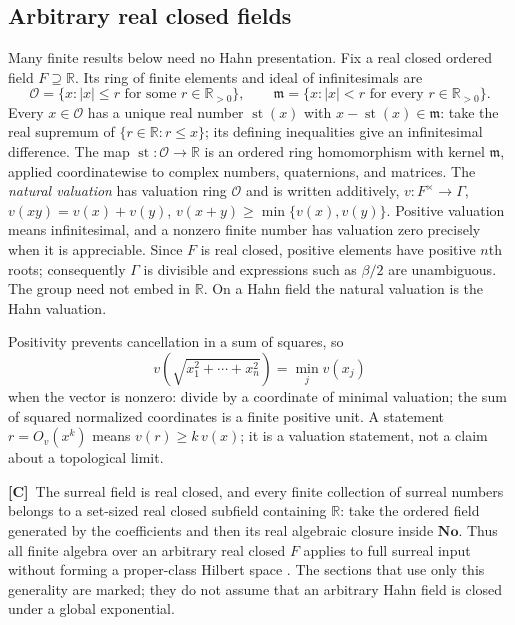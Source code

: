\documentclass[11pt,oneside]{article}
\numberwithin{equation}{section}
\theoremstyle{plain}
\theoremstyle{definition}
\theoremstyle{remark}
\newcommand{\R}{\mathbb R}
\newcommand{\No}{\mathbf{No}}
\newcommand{\OO}{\mathcal O}
\newcommand{\mm}{\mathfrak m}
\DeclareMathOperator{\st}{st}
\newcommand{\abs}[1]{\left|#1\right|}
\newcommand{\TC}{\textcolor{TierC}{\textsf{\bfseries[C]}}}
\begin{document}
\subsection{Arbitrary real closed fields}\label{qgs:hol:sec:scalars}
Many finite results below need no Hahn presentation. Fix a real closed ordered field $F\supseteq\R$. Its ring of finite elements and ideal of infinitesimals are
\[
 \OO=\{x:\abs{x}\leq r\text{ for some }r\in\R_{>0}\},\qquad
 \mm=\{x:\abs{x}<r\text{ for every }r\in\R_{>0}\}.
\]
Every $x\in\OO$ has a unique real number $\st(x)$ with $x-\st(x)\in\mm$: take the real supremum of $\{r\in\R:r\leq x\}$; its defining inequalities give an infinitesimal difference. The map $\st:\OO\to\R$ is an ordered ring homomorphism with kernel $\mm$, applied coordinatewise to complex numbers, quaternions, and matrices. The \emph{natural valuation} has valuation ring $\OO$ and is written additively, $v:F^\times\to\Gamma$, $v(xy)=v(x)+v(y)$, $v(x+y)\ge\min\{v(x),v(y)\}$. Positive valuation means infinitesimal, and a nonzero finite number has valuation zero precisely when it is appreciable. Since $F$ is real closed, positive elements have positive $n$th roots; consequently $\Gamma$ is divisible and expressions such as $\beta/2$ are unambiguous. The group need not embed in $\R$. On a Hahn field the natural valuation is the Hahn valuation.

Positivity prevents cancellation in a sum of squares, so
\begin{equation}\label{qgs:hol:eq:normval}
 v\!\left(\sqrt{x_1^2+\cdots+x_n^2}\right)=\min_jv(x_j)
\end{equation}
when the vector is nonzero: divide by a coordinate of minimal valuation; the sum of squared normalized coordinates is a finite positive unit. A statement $r=O_v(x^k)$ means $v(r)\ge k\,v(x)$; it is a valuation statement, not a claim about a topological limit.

\TC\ The surreal field is real closed, and every finite collection of surreal numbers belongs to a set-sized real closed subfield containing $\R$: take the ordered field generated by the coefficients and then its real algebraic closure inside $\No$. Thus all finite algebra over an arbitrary real closed $F$ applies to full surreal input without forming a proper-class Hilbert space \cite{Conway}. The sections that use only this generality are marked; they do not assume that an arbitrary Hahn field is closed under a global exponential.
\end{document}
